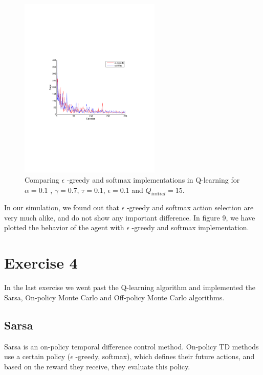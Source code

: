 \documentclass[a4paper,11pt]{article}
\begin{document}
\begin{figure}[b!]
  \centering
    \includegraphics[trim=4cm 8.5cm 4cm 8.5cm,clip,width=0.6\textwidth]{figures/egresoftcomp.pdf}
    \caption{Comparing $\epsilon$ -greedy and softmax implementations in Q-learning for $\alpha = 0.1$ , $\gamma = 0.7$, $\tau = 0.1$, $\epsilon = 0.1$ and $Q_{initial} = 15$.}
    \label{egresoftcomp}
\end{figure}

In our simulation, we found out that $\epsilon$ -greedy and softmax action selection are very much alike, and do not show any important difference. In figure 9, we have plotted the behavior of the agent with $\epsilon$ -greedy and softmax implementation.













\section*{Exercise 4}
In the last exercise we went past the Q-learning algorithm and implemented the Sarsa, On-policy Monte Carlo and Off-policy Monte Carlo algorithms. 	
\subsection*{Sarsa}
Sarsa is an on-policy temporal difference control method. On-policy TD methods use a certain policy ($\epsilon$ -greedy, softmax), which defines their future actions, and based on the reward they receive, they evaluate this policy.
\end{document}

